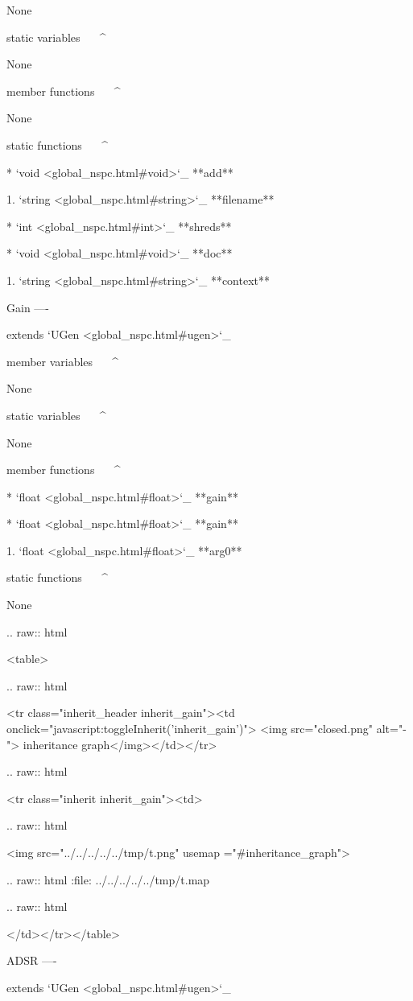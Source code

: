 	None

static variables
^^^^^^^^^^^^^^^^

	None

member functions
^^^^^^^^^^^^^^^^


	None

static functions
^^^^^^^^^^^^^^^^

	* `void <global_nspc.html#void>`_ **add**

		1. `string <global_nspc.html#string>`_ **filename**

	* `int <global_nspc.html#int>`_ **shreds**

	* `void <global_nspc.html#void>`_ **doc**

		1. `string <global_nspc.html#string>`_ **context**

Gain
----

extends `UGen <global_nspc.html#ugen>`_ 

member variables
^^^^^^^^^^^^^^^^

	None

static variables
^^^^^^^^^^^^^^^^

	None

member functions
^^^^^^^^^^^^^^^^

	* `float <global_nspc.html#float>`_ **gain**

	* `float <global_nspc.html#float>`_ **gain**

		1. `float <global_nspc.html#float>`_ **arg0**

static functions
^^^^^^^^^^^^^^^^


	None


  .. raw:: html

   <table>


  .. raw:: html

   <tr class="inherit_header inherit_gain"><td onclick="javascript:toggleInherit('inherit_gain')"> <img src="closed.png" alt="-"> inheritance graph</img></td></tr>


  .. raw:: html

   <tr class="inherit inherit_gain"><td>


  .. raw:: html

   <img src="../../../../../tmp/t.png" usemap ="#inheritance_graph">


  .. raw:: html
   :file:   ../../../../../tmp/t.map


  .. raw:: html

   </td></tr></table>

ADSR
----

extends `UGen <global_nspc.html#ugen>`_ 

